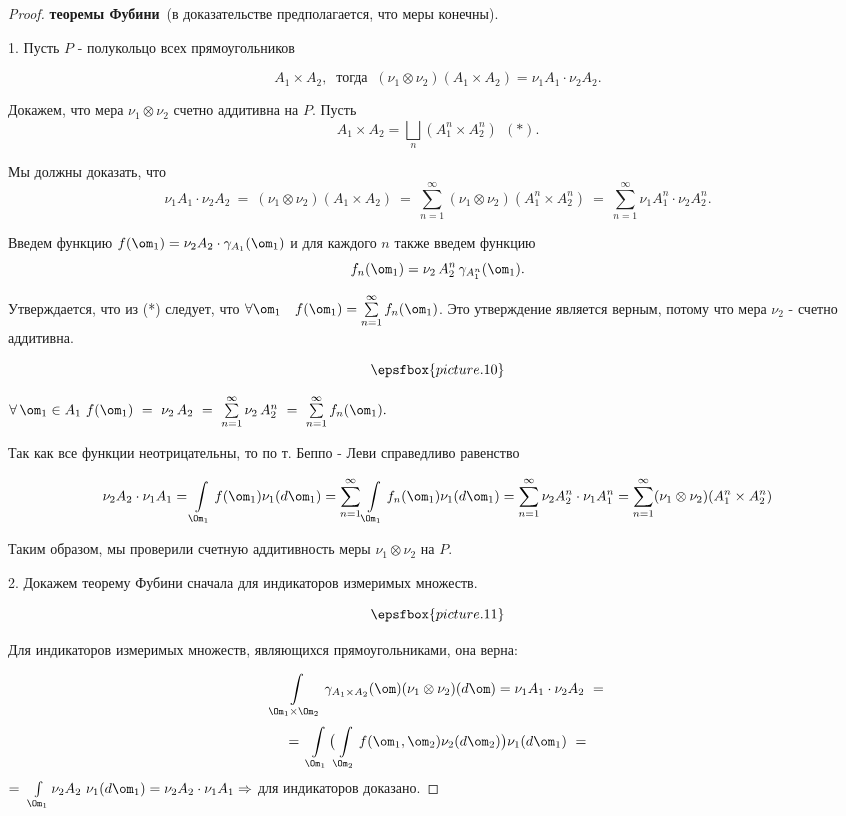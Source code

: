 \documentclass[a4paper]{article}
\begin{document}
\begin{proof}\textbf{теоремы Фубини}\ (в доказательстве предполагается, что меры
конечны).

1. Пусть $P$ - полукольцо всех прямоугольников

$$
A_1 \times A_2,\  \mbox{ тогда } \ (\nu_1 \otimes \nu_2 ) (A_1
\times A_2) = \nu_1 A_1 \cdot \nu_2 A_2.
$$

Докажем, что мера $\nu_1 \otimes \nu_2$ счетно аддитивна на $P$.
Пусть
$$A_1 \times A_2 = \bigsqcup \limits_{n} (A_1^n
\times A_2^n) \ \ (*).$$

Мы должны доказать, что
$$\nu_1 A_1 \cdot \nu_2 A_2 \  =\  (\nu_1 \otimes \nu_2)(A_1 \times A_2) \
=\ \sum \limits_{n=1}^{\infty} (\nu_1 \otimes \nu_2) (A_1^n \times
A_2^n) \  = \  \sum \limits_{n=1}^{\infty} \nu_1 A_1^n \cdot \nu_2
A_2^n.$$

Введем функцию $f(\om_1) = \nu_2 A_2 \cdot \gamma_{A_1} (\om_1)$ и
для каждого $n$ также введем функцию $$f_n(\om_1) = \nu_2 \,
A_2^n\,  \gamma_{A_1^n} (\om_1).$$

Утверждается, что из (*) следует, что $\forall \om_1 \quad
f(\om_1) = \sum \limits_{n=1}^\infty f_n(\om_1)$. Это утверждение
является верным, потому что мера $\nu_2$ - счетно аддитивна.

$$\epsfbox{picture.10}$$

$\forall \, \om_1 \in A_1 \ f(\om_1)\  =\  \nu_2 \, A_2 \  = \
\sum\limits_{n=1}^{\infty} \nu_2 \, A_{2}^{n} \ =\  \sum
\limits_{n=1}^{\infty} f_n(\om_1).$

Так как все функции неотрицательны, то по т. Беппо - Леви
справедливо равенство

$$\nu_2 A_2 \cdot \nu_1 A_1 = \int \limits_{\Om_1} f(\om_1) \nu_1
(d\om_1) = \sum \limits_{n=1}^{\infty} \int \limits_{\Om_1}
f_n(\om_1) \nu_1 (d\om_1) = \sum \limits_{n=1}^{\infty} \nu_2
A_2^n \cdot \nu_1 A_1^n  = \sum \limits_{n=1}^{\infty} (\nu_1
\otimes \nu_2) (A_1^n \times A_2^n)$$

Таким образом, мы проверили счетную аддитивность меры $\nu_1
\otimes \nu_2$ на $P$.

2. Докажем теорему Фубини сначала для индикаторов измеримых
множеств.

$$\epsfbox{picture.11}$$

Для индикаторов измеримых множеств, являющихся прямоугольниками,
она верна:

$$\int \limits_{\Om_1 \times \Om_2} \gamma_{A_1 \times A_2}(\om)
(\nu_1 \otimes \nu_2) (d\om) = \nu_1 A_1 \cdot \nu_2 A_2\ =$$
$$ =\  \int \limits_{\Om_1} \bigl( \int \limits_{\Om_2}
f(\om_1, \om_2) \nu_2 (d\om_2) \bigr) \nu_1 (d\om_1)\ = $$ $=\
\int \limits_{\Om_1} \nu_2 A_2 \ \nu_1 (d\om_1) = \nu_2 A_2\cdot
\nu_1 A_1 \Rightarrow$ для индикаторов доказано.


\end{proof}
\end{document}
